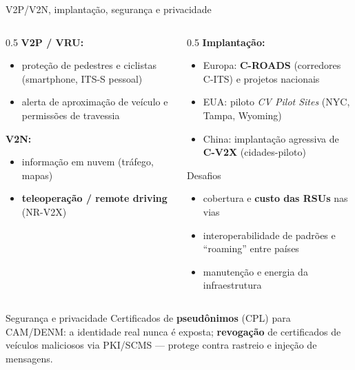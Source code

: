 \documentclass[aspectratio=169,11pt]{beamer}
\begin{document}
\begin{frame}{V2P/V2N, implantação, segurança e privacidade}
  \begin{columns}
    \begin{column}{0.5\textwidth}
      \textbf{V2P / VRU:}
      \begin{itemize}
        \item proteção de pedestres e ciclistas (smartphone, ITS-S pessoal)
        \item alerta de aproximação de veículo e permissões de travessia
      \end{itemize}
      \textbf{V2N:}
      \begin{itemize}
        \item informação em nuvem (tráfego, mapas)
        \item \textbf{teleoperação / remote driving} (NR-V2X)
      \end{itemize}
    \end{column}
    \begin{column}{0.5\textwidth}
      \textbf{Implantação:}
      \begin{itemize}
        \item Europa: \textbf{C-ROADS} (corredores C-ITS) e projetos nacionais
        \item EUA: piloto \emph{CV Pilot Sites} (NYC, Tampa, Wyoming)
        \item China: implantação agressiva de \textbf{C-V2X} (cidades-piloto)
      \end{itemize}
      \begin{alertblock}{Desafios}
        \begin{itemize}
          \item cobertura e \textbf{custo das RSUs} nas vias
          \item interoperabilidade de padrões e ``roaming'' entre países
          \item manutenção e energia da infraestrutura
        \end{itemize}
      \end{alertblock}
    \end{column}
  \end{columns}
  \pause
  \begin{block}{Segurança e privacidade}
    Certificados de \textbf{pseudônimos} (CPL) para CAM/DENM: a identidade real nunca é exposta; \textbf{revogação} de certificados de veículos maliciosos via PKI/SCMS --- protege contra rastreio e injeção de mensagens.
  \end{block}
\end{frame}
\end{document}
